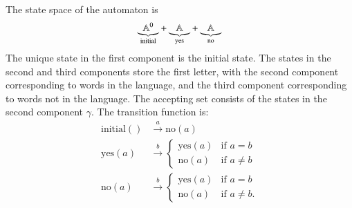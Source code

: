 


{
The state space of the automaton is 
    \begin{align*}
    \underbrace{\mathbb A^0}_{\text{initial}} + \underbrace{\mathbb A}_{\text{yes}} + \underbrace{\mathbb A}_{\text{no}}
    \end{align*}
    The unique state in the first component is the  initial state. The states in the second and third components store the first letter, with the second component  corresponding to words in the language, and the third component corresponding to words not in the language. The accepting set consists of the states in the second component $\gamma$. The transition function is:
    \begin{align*}
    \text{initial}()  & \stackrel a \to \text{no}(a) \\
    \text{yes}(a) & \stackrel b \to 
    \begin{cases}
    \text{yes}(a) & \text{if $a = b$} \\
    \text{no}(a) & \text{if $a \neq b$}
    \end{cases} \\
    \text{no}(a) & \stackrel b \to 
    \begin{cases}
    \text{yes}(a) & \text{if $a = b$} \\
    \text{no}(a) & \text{if $a \neq b$}.
    \end{cases} 
    \end{align*}

}

